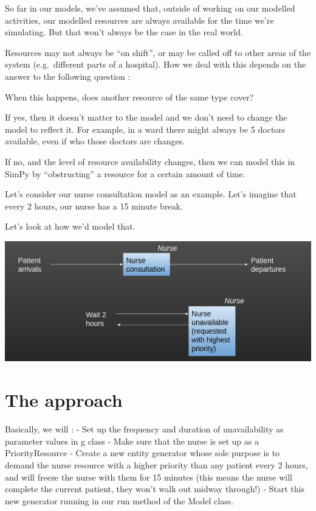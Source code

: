 \documentclass[
  letterpaper,
  DIV=11,
  numbers=noendperiod]{scrreprt}
\begin{document}
So far in our models, we've assumed that, outside of working on our
modelled activities, our modelled resources are always available for the
time we're simulating. But that won't always be the case in the real
world.

Resources may not always be ``on shift'', or may be called off to other
areas of the system (e.g.~different parts of a hospital). How we deal
with this depends on the answer to the following question :

When this happens, does another resource of the same type cover?

If yes, then it doesn't matter to the model and we don't need to change
the model to reflect it. For example, in a ward there might always be 5
doctors available, even if who those doctors are changes.

If no, and the level of resource availability changes, then we can model
this in SimPy by ``obstructing'' a resource for a certain amount of
time.

Let's consider our nurse consultation model as an example. Let's imagine
that every 2 hours, our nurse has a 15 minute break.

Let's look at how we'd model that.

\includegraphics{images/modelling_unavailability.png}

\section{The approach}\label{the-approach}

Basically, we will : - Set up the frequency and duration of
unavailability as parameter values in g class - Make sure that the nurse
is set up as a PriorityResource - Create a new entity generator whose
sole purpose is to demand the nurse resource with a higher priority than
any patient every 2 hours, and will freeze the nurse with them for 15
minutes (this means the nurse will complete the current patient, they
won't walk out midway through!) - Start this new generator running in
our run method of the Model class.
\end{document}
